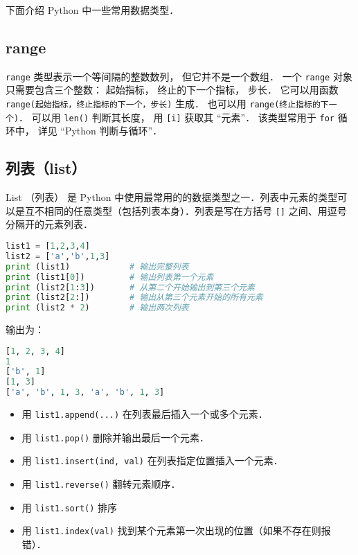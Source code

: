 

下面介绍 Python 中一些常用数据类型． 

\subsection{range}
\verb|range| 类型表示一个等间隔的整数数列， 但它并不是一个数组． 一个 \verb|range| 对象只需要包含三个整数： 起始指标， 终止的下一个指标， 步长． 它可以用函数 \verb|range(起始指标，终止指标的下一个，步长)| 生成． 也可以用 \verb|range(终止指标的下一个)|． 可以用 \verb|len()| 判断其长度， 用 \verb|[i]| 获取其 “元素”． 该类型常用于 \verb|for| 循环中， 详见 “Python 判断与循环”．

\subsection{列表（list）}
List （列表） 是 Python 中使用最常用的的数据类型之一．列表中元素的类型可以是互不相同的任意类型（包括列表本身）．列表是写在方括号 \verb|[]| 之间、用逗号分隔开的元素列表．
\begin{lstlisting}[language=python]
list1 = [1,2,3,4]
list2 = ['a','b',1,3]
print (list1)            # 输出完整列表
print (list1[0])         # 输出列表第一个元素
print (list2[1:3])       # 从第二个开始输出到第三个元素
print (list2[2:])        # 输出从第三个元素开始的所有元素
print (list2 * 2)        # 输出两次列表
\end{lstlisting}
输出为：
\begin{lstlisting}[language=python]
[1, 2, 3, 4]
1
['b', 1]
[1, 3]
['a', 'b', 1, 3, 'a', 'b', 1, 3]
\end{lstlisting}
\begin{itemize}
\item 用 \verb|list1.append(...)| 在列表最后插入一个或多个元素．
\item 用 \verb|list1.pop()| 删除并输出最后一个元素．
\item 用 \verb|list1.insert(ind, val)| 在列表指定位置插入一个元素．
\item 用 \verb|list1.reverse()| 翻转元素顺序．
\item 用 \verb|list1.sort()| 排序
\item 用 \verb|list1.index(val)| 找到某个元素第一次出现的位置（如果不存在则报错）．
\end{itemize}

